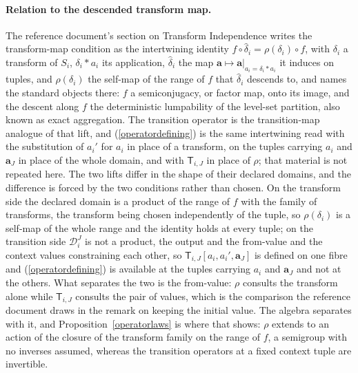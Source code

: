 \documentclass{article}
\theoremstyle{definition}
\theoremstyle{remark}
\begin{document}
\paragraph{Relation to the descended transform map.} The reference document's section on Transform Independence writes the transform-map condition as the intertwining identity $f \circ \hat{\delta}_i = \rho(\delta_i) \circ f$, with $\delta_i$ a transform of $S_i$, $\delta_i \ast a_i$ its application, $\hat{\delta}_i$ the map $\boldsymbol{a} \mapsto \boldsymbol{a}|_{a_i = \delta_i \ast a_i}$ it induces on tuples, and $\rho(\delta_i)$ the self-map of the range of $f$ that $\hat{\delta}_i$ descends to, and names the standard objects there: $f$ a semiconjugacy, or factor map, onto its image, and the descent along $f$ the deterministic lumpability of the level-set partition, also known as exact aggregation. The transition operator is the transition-map analogue of that lift, and (\ref{operatordefining}) is the same intertwining read with the substitution of $a_i'$ for $a_i$ in place of a transform, on the tuples carrying $a_i$ and $\boldsymbol{a}_J$ in place of the whole domain, and with $\mathsf{T}_{i,J}$ in place of $\rho$; that material is not repeated here. The two lifts differ in the shape of their declared domains, and the difference is forced by the two conditions rather than chosen. On the transform side the declared domain is a product of the range of $f$ with the family of transforms, the transform being chosen independently of the tuple, so $\rho(\delta_i)$ is a self-map of the whole range and the identity holds at every tuple; on the transition side $\mathcal{D}_i^J$ is not a product, the output and the from-value and the context values constraining each other, so $\mathsf{T}_{i,J}[a_i, a_i', \boldsymbol{a}_J]$ is defined on one fibre and (\ref{operatordefining}) is available at the tuples carrying $a_i$ and $\boldsymbol{a}_J$ and not at the others. What separates the two is the from-value: $\rho$ consults the transform alone while $\mathsf{T}_{i,J}$ consults the pair of values, which is the comparison the reference document draws in the remark on keeping the initial value. The algebra separates with it, and Proposition~\ref{operatorlaws} is where that shows: $\rho$ extends to an action of the closure of the transform family on the range of $f$, a semigroup with no inverses assumed, whereas the transition operators at a fixed context tuple are invertible.
\end{document}
